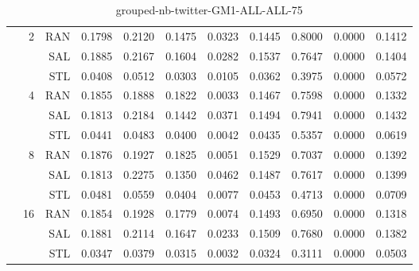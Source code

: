 \begin{center}
\begin{table}[htbp]
\begin{center}
\begin{tabular}{ | r | r | r | r | r | r | r | r | r | r | r |}
 & \multirow{3}{*}{2} & RAN & 0.1798 & 0.2120 & 0.1475 & 0.0323 & 0.1445 & 0.8000 & 0.0000 & 0.1412\\ \cline{3-11}
 &   & SAL & 0.1885 & 0.2167 & 0.1604 & 0.0282 & 0.1537 & 0.7647 & 0.0000 & 0.1404\\ \cline{3-11}
 &   & STL & 0.0408 & 0.0512 & 0.0303 & 0.0105 & 0.0362 & 0.3975 & 0.0000 & 0.0572\\ \cline{2-11}
 & \multirow{3}{*}{4} & RAN & 0.1855 & 0.1888 & 0.1822 & 0.0033 & 0.1467 & 0.7598 & 0.0000 & 0.1332\\ \cline{3-11}
 &   & SAL & 0.1813 & 0.2184 & 0.1442 & 0.0371 & 0.1494 & 0.7941 & 0.0000 & 0.1432\\ \cline{3-11}
 &   & STL & 0.0441 & 0.0483 & 0.0400 & 0.0042 & 0.0435 & 0.5357 & 0.0000 & 0.0619\\ \cline{2-11}
 & \multirow{3}{*}{8} & RAN & 0.1876 & 0.1927 & 0.1825 & 0.0051 & 0.1529 & 0.7037 & 0.0000 & 0.1392\\ \cline{3-11}
 &   & SAL & 0.1813 & 0.2275 & 0.1350 & 0.0462 & 0.1487 & 0.7617 & 0.0000 & 0.1399\\ \cline{3-11}
 &   & STL & 0.0481 & 0.0559 & 0.0404 & 0.0077 & 0.0453 & 0.4713 & 0.0000 & 0.0709\\ \cline{2-11}
 & \multirow{3}{*}{16} & RAN & 0.1854 & 0.1928 & 0.1779 & 0.0074 & 0.1493 & 0.6950 & 0.0000 & 0.1318\\ \cline{3-11}
 &   & SAL & 0.1881 & 0.2114 & 0.1647 & 0.0233 & 0.1509 & 0.7680 & 0.0000 & 0.1382\\ \cline{3-11}
 &   & STL & 0.0347 & 0.0379 & 0.0315 & 0.0032 & 0.0324 & 0.3111 & 0.0000 & 0.0503\\ \cline{2-11}
\hline
\end{tabular}
\caption{grouped-nb-twitter-GM1-ALL-ALL-75}
\end{center}
 \end{table}
\end{center}

